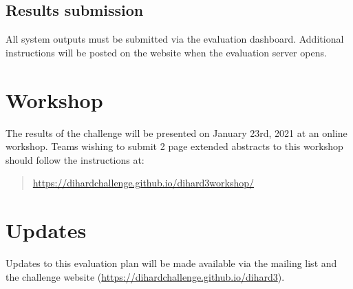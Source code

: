 \documentclass{article}
\begin{document}
\subsection{Results submission}
All system outputs must be submitted via the evaluation dashboard. Additional instructions will be posted on the website when the evaluation server opens.


\section{Workshop}
The results of the challenge will be presented on January 23rd, 2021 at an online workshop. Teams wishing to submit 2 page extended abstracts to this workshop should follow the instructions at:
%
    \begin{quote}
        \url{https://dihardchallenge.github.io/dihard3workshop/}
    \end{quote}
%



\section{Updates}
Updates to this evaluation plan will be made available via the mailing list and the challenge website (\url{https://dihardchallenge.github.io/dihard3}).
\end{document}

